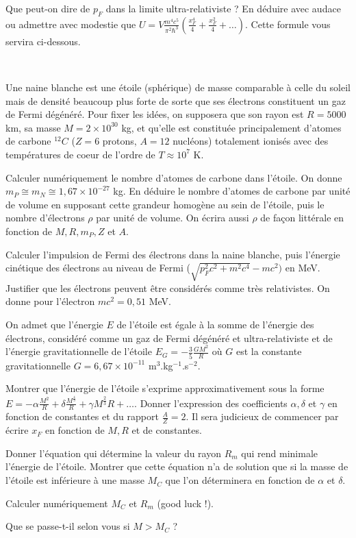 \question Que peut-on dire de $p_F$ dans la limite ultra-relativiste ? En déduire avec audace ou admettre avec modestie que $U=V\frac{m^4c^5}{\pi^2 \hbar^3}(\frac{x_F^4}{4}+\frac{x_F^2}{4}+\ldots)$. Cette formule vous servira ci-dessous.



\ 

Une naine blanche est une étoile (sphérique) de masse comparable à celle du soleil mais de densité beaucoup plus forte de sorte que ses électrons constituent un gaz de Fermi dégénéré. Pour fixer les idées, on supposera que son rayon est $R= 5 000$ km, sa masse $M=2\times 10^{30}$ kg, et qu'elle est constituée principalement d'atomes de carbone $^{12}C$ ($Z=6$ protons, $A=12$ nucléons) totalement ionisés avec des températures de coeur de l'ordre de $T \approx 10^7$ K.

\question Calculer numériquement le nombre d'atomes de carbone dans l'étoile. On donne $m_P \cong m_N \cong 1,67 \times 10^{-27}$ kg. En déduire le nombre d'atomes de carbone par unité de volume en supposant cette grandeur homogène au sein de l'étoile, puis le nombre d'électrons $\rho$ par unité de volume. On écrira aussi $\rho$ de façon littérale en fonction de $M, R, m_P, Z$ et $A$.

\question Calculer l'impulsion de Fermi des électrons dans la naine blanche, puis l'énergie cinétique des électrons au niveau de Fermi ($\sqrt{p_F^2c^2+m^2c^4}-mc^2)$ en MeV. Justifier que les électrons peuvent être considérés comme très relativistes. On donne pour l'électron $mc^2=0,51$ MeV.


On admet que l'énergie $E$ de l'étoile est égale à la somme de l'énergie des électrons, considéré comme un gaz de Fermi dégénéré et ultra-relativiste et de l'énergie gravitationnelle
de l'étoile $E_G=-\frac{3}{5}\frac{GM^2}{R}$ où $G$ est la constante gravitationnelle $G=6,67 \times 10^{-11}$  m$^3$.kg$^{-1}$.s$^{-2}$. 

\question Montrer que l'énergie de l'étoile s'exprime approximativement sous la forme $E=-\alpha \frac{M^2}{R}+\delta \frac{M^{\frac{4}{3}}}{R}+\gamma M^{\frac{2}{3}} R+\ldots$. Donner l'expression des coefficients $\alpha, \delta$ et $\gamma$ en fonction de constantes et du rapport $\frac{A}{Z}=2$. Il sera judicieux de commencer par écrire $x_F$ en fonction de $M, R$ et de constantes.

\question Donner l'équation qui détermine la valeur du rayon $R_m$ qui rend minimale l'énergie de l'étoile. Montrer que cette équation n'a de solution que si la masse de l'étoile est inférieure à une masse $M_C$ que l'on déterminera en fonction de $\alpha$ et $\delta$. 

\question Calculer numériquement $M_C$ et $R_m$ (good luck !).

\question Que se passe-t-il selon vous si $M > M_C$ ?

